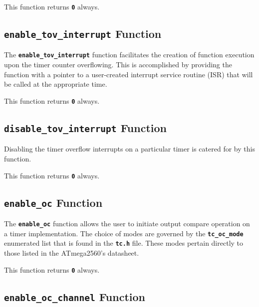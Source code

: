 \documentclass[a4paper, oneside, 11pt, titlepage, onecolumn, openright]{report}
\begin{document}
This function returns \textbf{\texttt{0}} always.
			
				\subsection{\textbf{\texttt{enable\_tov\_interrupt}} Function}
					\label{ss:Hardware Abstraction Libraries:tc Module:enable_tov_interrupt Function}
			
					The \textbf{\texttt{enable\_tov\_interrupt}} function facilitates the creation of function execution upon the timer counter overflowing. This is accomplished by providing the function with a pointer to a user-created interrupt service routine (ISR) that will be called at the appropriate time.
			
This function returns \textbf{\texttt{0}} always.
			
				\subsection{\textbf{\texttt{disable\_tov\_interrupt}} Function}
					\label{ss:Hardware Abstraction Libraries:tc Module:disable_tov_interrupt Function}
			
 					Disabling the timer overflow interrupts on a particular timer is catered for by this function. 
			
This function returns \textbf{\texttt{0}} always.
			
				\subsection{\textbf{\texttt{enable\_oc}} Function}
					\label{ss:Hardware Abstraction Libraries:tc Module:enable_oc Function}
			
 					The \textbf{\texttt{enable\_oc}} function allows the user to initiate output compare operation on a timer implementation. The choice of modes are governed by the \textbf{\texttt{tc\_oc\_mode}} enumerated list that is found in the \textbf{\texttt{tc.h}} file. These modes pertain directly to those listed in the ATmega2560's datasheet.
			
This function returns \textbf{\texttt{0}} always.

				\subsection{\textbf{\texttt{enable\_oc\_channel}} Function}
					\label{ss:Hardware Abstraction Libraries:tc Module:enable_oc_channel Function}
			
\end{document}

